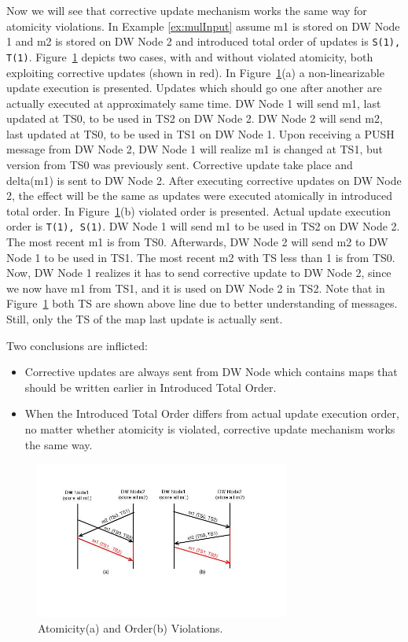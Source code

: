 \documentclass{sig-semester}
\def\EXORD{actual update execution order\xspace}
\begin{document}
Now we will see that corrective update mechanism works the same way for atomicity violations. In Example \ref{ex:mulInput} assume m1 is stored on DW Node 1 and m2 is stored on DW Node 2 and introduced total order of updates is \texttt{S(1), T(1)}. Figure~\ref{fig:Atomicity} depicts two cases, with and without violated atomicity, both exploiting corrective updates (shown in red). In Figure~\ref{fig:Atomicity}(a) a non-linearizable update execution is presented. Updates which should go one after another are actually executed at approximately same time. DW Node 1 will send m1, last updated at TS0, to be used in TS2 on DW Node 2. DW Node 2 will send m2, last updated at TS0, to be used in TS1 on DW Node 1. Upon receiving a PUSH message from DW Node 2, DW Node 1 will realize m1 is changed at TS1, but version from TS0 was previously sent. Corrective update take place and delta(m1) is sent to DW Node 2. After executing corrective updates on DW Node 2, the effect will be the same as updates were executed atomically in introduced total order. In Figure~\ref{fig:Atomicity}(b) violated order is presented. Actual update execution order is \texttt{T(1), S(1)}. DW Node 1 will send m1 to be used in TS2 on DW Node 2. The most recent m1 is from TS0. Afterwards, DW Node 2 will send m2 to DW Node 1 to be used in TS1. The most recent m2 with TS less than 1 is from TS0. Now, DW Node 1 realizes it has to send corrective update to DW Node 2, since we now have m1 from TS1, and it is used on DW Node 2 in TS2. Note that in Figure~\ref{fig:Atomicity} both TS are shown above line due to better understanding of messages. Still, only the TS of the map last update is actually sent.

Two conclusions are inflicted:
\begin{itemize}
 \item Corrective updates are always sent from DW Node which contains maps that should be written earlier in Introduced Total Order.

 \item When the Introduced Total Order differs from \EXORD, no matter whether atomicity is violated, corrective update mechanism works the same way. 
\end{itemize} 

\begin{figure}
\includegraphics[width=3.3in]{AtomicityOrder.jpg}
\vspace{-18mm}
\caption{Atomicity(a) and Order(b) Violations.}
\label{fig:Atomicity}
\vspace{-5mm}
\end{figure}
\end{document}
